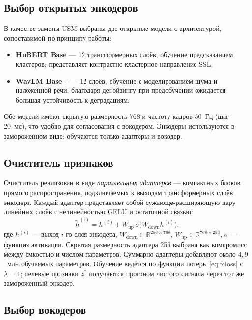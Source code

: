 \subsection{Выбор открытых энкодеров}
\label{ssec:enc-choice}

В качестве замены USM выбраны две открытые модели с архитектурой,
сопоставимой по принципу работы:
\begin{itemize}
    \item \textbf{HuBERT Base} --- 12 трансформерных слоёв, обучение
        предсказанием кластеров; представляет контрастно-кластерное
        направление SSL;
    \item \textbf{WavLM Base+} --- 12 слоёв, обучение с моделированием шума и
        наложенной речи; благодаря денойзингу при предобучении ожидается большая
        устойчивость к деградациям.
\end{itemize}
Обе модели имеют скрытую размерность 768 и частоту кадров 50~Гц (шаг 20~мс), что
удобно для согласования с вокодером. Энкодеры используются в замороженном виде:
обучаются только адаптеры и вокодер.

\subsection{Очиститель признаков}
\label{ssec:cleaner}

Очиститель реализован в виде \emph{параллельных адаптеров} --- компактных
блоков прямого распространения, подключаемых к выходам трансформерных слоёв
энкодера. Каждый адаптер представляет собой сужающе-расширяющую пару линейных
слоёв с нелинейностью GELU и остаточной связью:
\begin{equation}
    \tilde{h}^{(i)} = h^{(i)} +
    W_{\text{up}}\,\sigma\!\big(W_{\text{down}} h^{(i)}\big),
    \label{eq:adapter}
\end{equation}
где $h^{(i)}$ --- выход $i$-го слоя энкодера, $W_{\text{down}}\in
\mathbb{R}^{256\times 768}$, $W_{\text{up}}\in\mathbb{R}^{768\times256}$,
$\sigma$ --- функция активации. Скрытая размерность адаптера 256 выбрана как
компромисс между ёмкостью и числом параметров. Суммарно адаптеры добавляют около
$4{,}9$~млн обучаемых параметров. Обучение ведётся по функции
потерь~\eqref{eq:fcloss} с $\lambda = 1$; целевые признаки $z^{\ast}$ получаются
прогоном чистого сигнала через тот же замороженный энкодер.

\subsection{Выбор вокодеров}
\label{ssec:voc-choice}

